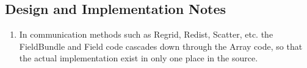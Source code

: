 
\subsection{Design and Implementation Notes}

\begin{enumerate}

\item In communication methods such as Regrid, Redist, Scatter, etc. 
the FieldBundle and Field code cascades down through the Array code, so 
that the actual implementation exist in only one place in the source.

\end{enumerate}
